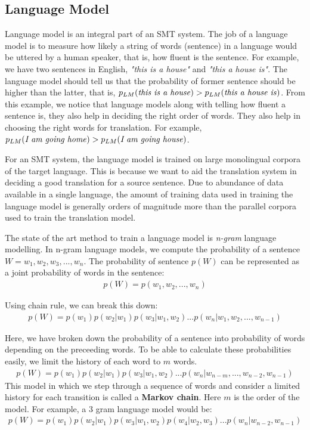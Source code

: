 \subsection{Language Model}\label{intro-lm}
Language model is an integral part of an SMT system. The job of a language model is to measure how likely a string of words (sentence) in a language would be uttered by a human speaker, that is, how fluent is the sentence. For example, we have two sentences in English, \textit{"this is a house"} and \textit{"this a house is"}. The language model should tell us that the probability of former sentence should be higher than the latter, that is, $p_{LM}(\textnormal{\textit{this is a house}}) > p_{LM}(\textnormal{\textit{this a house is}})$. From this example, we notice that language models along with telling how fluent a sentence is, they also help in deciding the right order of words. They also help in choosing the right words for translation. For example, $p_{LM}(\textnormal{\textit{I am going home}}) > p_{LM}(\textnormal{\textit{I am going house}})$.

For an SMT system, the language model is trained on large monolingual corpora of the target language. This is because we want to aid the translation system in deciding a good translation for a source sentence. Due to abundance of data available in a single language, the amount of training data used in training the language model is generally orders of magnitude more than the parallel corpora used to train the translation model. 

The state of the art method to train a language model is \textit{n-gram} language modelling. In n-gram language models, we compute the probability of a sentence $W = w_1, w_2, w_3,..., w_n$. The probability of sentence $p(W)$ can be represented as a joint probability of words in the sentence: 
\begin{eqnarray}
	p(W) = p(w_1, w_2, ..., w_n)
\end{eqnarray}

Using chain rule, we can break this down:
\begin{eqnarray}
p(W) = p(w_1)p(w_2|w_1)p(w_3| w_1, w_2)...p(w_n|w_1, w_2, ...,w_{n-1})
\end{eqnarray}

Here, we have broken down the probability of a sentence into probability of words depending on the preceeding words. To be able to calculate these probabilities easily, we limit the history of each word to $m$ words.
\begin{eqnarray}
p(W) = p(w_1)p(w_2|w_1)p(w_3| w_1, w_2)...p(w_n|w_{n-m}, ...,w_{n-2}, w_{n-1})
\end{eqnarray}
This model in which we step through a sequence of words and consider a limited history for each transition is called a \textbf{Markov chain}. Here $m$ is the order of the model. For example, a 3 gram language model would be:
\begin{eqnarray}
p(W) = p(w_1)p(w_2|w_1)p(w_3| w_1, w_2)p(w_4|w_2, w_3)...p(w_n|w_{n-2}, w_{n-1})
\end{eqnarray}

